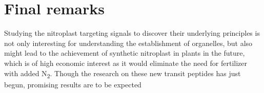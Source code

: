 \section{Final remarks}
Studying the nitroplast targeting signals to discover their underlying principles is not only interesting for understanding the establishment of organelles, but also might lead to the achievement of synthetic nitroplast in plants in the future, which is of high economic interest as it would eliminate the need for fertilizer with added N\textsubscript{2}. Though the research on these new transit peptides has just begun, promising results are to be expected